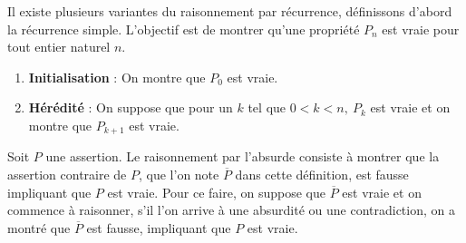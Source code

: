 \begin{definition}
    Il existe plusieurs variantes du raisonnement par récurrence, définissons d'abord la récurrence simple. L'objectif est de montrer qu'une propriété $P_n$ est vraie pour tout entier naturel $n$. 
    \begin{enumerate}
        \item \textbf{Initialisation} : On montre que $P_0$ est vraie.
        \item \textbf{Hérédité} : On suppose que pour un $k$ tel que $0 < k < n,\ P_k$ est vraie et on montre que $P_{k+1}$ est vraie.
    \end{enumerate}
\end{definition}

\begin{definition}
    Soit $P$ une assertion. Le raisonnement par l'absurde consiste à montrer que la assertion contraire de $P$, que l'on note $\overline{P}$ dans cette définition, est fausse impliquant que $P$ est vraie.
    Pour ce faire, on suppose que $\overline{P}$ est vraie et on commence à raisonner, s'il l'on arrive à une absurdité ou une contradiction, on a montré que $\overline{P}$ est fausse, impliquant que $P$ est vraie.
\end{definition}